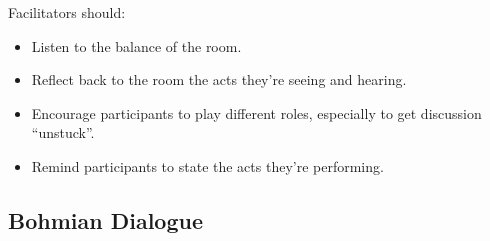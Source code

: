 \documentclass{article}
\newenvironment{nosepitemize}
{ \begin{itemize}
    \setlength{\itemsep}{0pt}
    \setlength{\parskip}{0pt}
    \setlength{\parsep}{0pt}     }
{ \end{itemize}                  }
\begin{document}
\begin{multicols}{2}
\noindent
Facilitators should:

\begin{nosepitemize}
    \item Listen to the balance of the room.
    \item Reflect back to the room the acts they're seeing and hearing.
    \item Encourage participants to play different roles, especially to get discussion “unstuck”.
    \item Remind participants to state the acts they're performing.
\end{nosepitemize}

\end{multicols}

\begin{center}
\section{Bohmian Dialogue}
\end{center}
\end{document}
